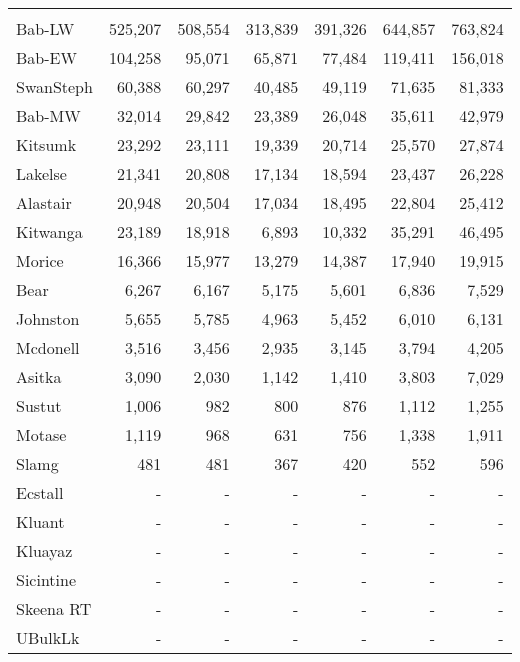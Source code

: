 \documentclass[french,11pt]{book}
\begin{document}
\begin{longtable}[t]{lrrrrrr}
\midrule\\ Bab-LW & 525,207 & 508,554 & 313,839 & 391,326 & 644,857 & 763,824\\ Bab-EW & 104,258 & 95,071 & 65,871 & 77,484 & 119,411 & 156,018\\ SwanSteph & 60,388 & 60,297 & 40,485 & 49,119 & 71,635 & 81,333\\ Bab-MW & 32,014 & 29,842 & 23,389 & 26,048 & 35,611 & 42,979\\ Kitsumk & 23,292 & 23,111 & 19,339 & 20,714 & 25,570 & 27,874\\ Lakelse & 21,341 & 20,808 & 17,134 & 18,594 & 23,437 & 26,228\\ Alastair & 20,948 & 20,504 & 17,034 & 18,495 & 22,804 & 25,412\\ Kitwanga & 23,189 & 18,918 & 6,893 & 10,332 & 35,291 & 46,495\\ Morice & 16,366 & 15,977 & 13,279 & 14,387 & 17,940 & 19,915\\ Bear & 6,267 & 6,167 & 5,175 & 5,601 & 6,836 & 7,529\\ Johnston & 5,655 & 5,785 & 4,963 & 5,452 & 6,010 & 6,131\\ Mcdonell & 3,516 & 3,456 & 2,935 & 3,145 & 3,794 & 4,205\\ Asitka & 3,090 & 2,030 & 1,142 & 1,410 & 3,803 & 7,029\\ Sustut & 1,006 & 982 & 800 & 876 & 1,112 & 1,255\\ Motase & 1,119 & 968 & 631 & 756 & 1,338 & 1,911\\ Slamg & 481 & 481 & 367 & 420 & 552 & 596\\ Ecstall & - & - & - & - & - & -\\ Kluant & - & - & - & - & - & -\\ Kluayaz & - & - & - & - & - & -\\ Sicintine & - & - & - & - & - & -\\ Skeena RT & - & - & - & - & - & -\\ UBulkLk & - & - & - & - & - & -\\* \end{longtable}

\endgroup{} \endgroup{}

\clearpage
\end{document}
